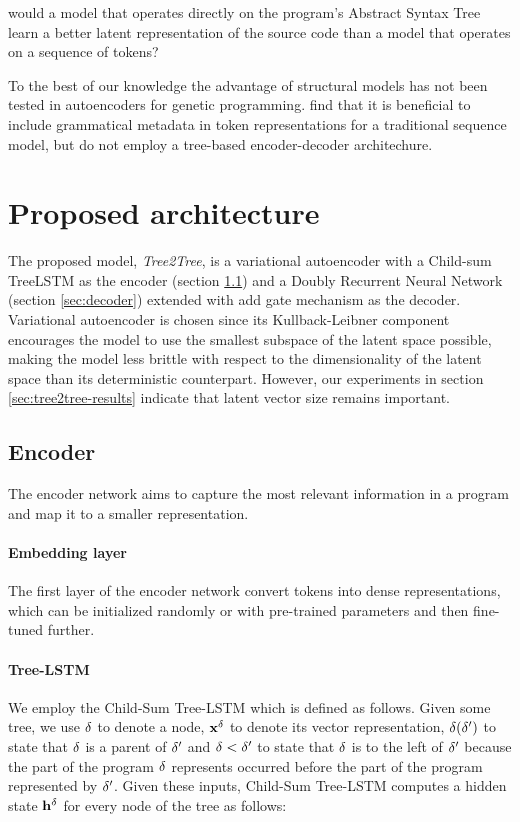 \begin{highlight}
    would a model that operates directly on the program's Abstract Syntax Tree learn a better latent representation of the source code than a model that operates on a sequence of tokens?
\end{highlight}

To the best of our knowledge the advantage of structural models has not been tested in autoencoders for genetic programming. 
\cite{kusner2017grammar,grammar-vae} find that it is beneficial to include grammatical metadata in token representations for a traditional sequence model, but do not employ a tree-based encoder-decoder architechure.

\newpage
\section{Proposed architecture}

The proposed model, \emph{Tree2Tree}, is a variational autoencoder with a Child-sum TreeLSTM as the encoder (section \ref{sec:encoder}) and a Doubly Recurrent Neural Network (section \ref{sec:decoder}) extended with add gate mechanism as the decoder.
Variational autoencoder \cite{kingma2013auto} is chosen since its Kullback-Leibner component encourages the model to use the smallest subspace of the latent space possible, making the model less brittle with respect to the dimensionality of the latent space than its deterministic counterpart.
However, our experiments in section \ref{sec:tree2tree-results} indicate that latent vector size remains important.

\subsection{Encoder}
\label{sec:encoder}
The encoder network aims to capture the most relevant information in a program and map it to a smaller representation. 

\paragraph{Embedding layer} The first layer of the encoder network convert tokens into dense representations, which can be initialized randomly or with pre-trained parameters and then fine-tuned further.


\paragraph{Tree-LSTM} We employ the Child-Sum Tree-LSTM \cite{tai2015improved} which is defined as follows. Given some tree, we use $\delta$ to denote a node, $\mathbf{x}^\delta$ to denote its vector representation, $\delta(\delta')$ to state that $\delta$ is a parent of $\delta'$ and $\delta < \delta'$ to state that $\delta$ is to the left of $\delta'$ because the part of the program $\delta$ represents occurred before the part of the program represented by $\delta'$.
Given these inputs, Child-Sum Tree-LSTM computes a hidden state $\mathbf{h}^\delta$ for every node of the tree as follows:

